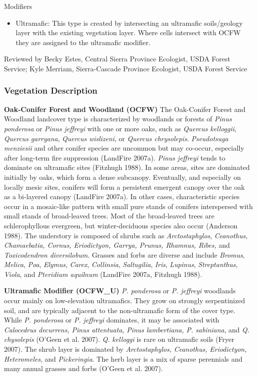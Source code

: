 Modifiers
\begin{itemize}
	\item Ultramafic: This type is created by intersecting an ultramafic soils/geology layer with the existing vegetation layer. Where cells intersect with OCFW they are assigned to the ultramafic modifier.
\end{itemize}

\noindent Reviewed by Becky Estes, Central Sierra Province Ecologist, USDA Forest Service; Kyle Merriam, Sierra-Cascade Province Ecologist, USDA Forest Service


\subsubsection{Vegetation Description}
\textbf{Oak-Conifer Forest and Woodland (OCFW)} The Oak-Conifer Forest and Woodland landcover type is characterized by woodlands or forests of \emph{Pinus ponderosa} or \emph{Pinus jeffreyi} with one or more oaks, such as \emph{Quercus kelloggii}, \emph{Quercus garryana}, \emph{Quercus wislizeni}, or \emph{Quercus chrysolepis}. \emph{Pseudotsuga menziesii} and other conifer species are uncommon but may co-occur, especially after long-term fire suppression (LandFire 2007a). \emph{Pinus jeffreyi} tends to dominate on ultramafic sites (Fitzhugh 1988). In some areas, sites are dominated initially by oaks, which form a dense subcanopy. Eventually, and especially on locally mesic sites, conifers will form a persistent emergent canopy over the oak as a bi-layered canopy (LandFire 2007a). In other cases, characteristic species occur in a mosaic-like pattern with small pure stands of conifers interspersed with small stands of broad-leaved trees. Most of the broad-leaved trees are schlerophyllous evergreen, but winter-deciduous species also occur (Anderson 1988). The understory is composed of shrubs such as \emph{Arctostaphylos}, \emph{Ceanothus, Chamaebatia, Cornus, Eriodictyon, Garrya, Prunus, Rhamnus, Ribes,} and \emph{Toxicodendron diversilobum}. Grasses and forbs are diverse and include \emph{Bromus}, \emph{Melica}, \emph{Poa}, \emph{Elymus}, \emph{Carex}, \emph{Collinsia}, \emph{Saltugilia}, \emph{Iris}, \emph{Lupinus}, \emph{Streptanthus}, \emph{Viola}, and \emph{Pteridium aquilnum} (LandFire 2007a, Fitzhugh 1988).

\begin{adjustwidth}{2cm}{}

\textbf{Ultramafic Modifier (OCFW\_U)}  \emph{P. ponderosa} or \emph{P. jeffreyi} woodlands occur mainly on low-elevation ultramafics. They grow on strongly serpentinized soil, and are typically adjacent to the non-ultramafic form of the cover type. While \emph{P. ponderosa} or \emph{P. jeffreyi} dominates, it may be associated with \emph{Calocedrus decurrens, Pinus attentuata, Pinus lambertiana, P. sabiniana}, and \emph{Q. chysolepis} (O'Geen et al. 2007). \emph{Q. kelloggi} is rare on ultramafic soils (Fryer 2007). The shrub layer is dominated by \emph{Arctostaphylos, Ceanothus, Eriodictyon, Heteromeles}, and \emph{Pickeringia}. The herb layer is a mix of sparse perennials and many annual grasses and forbs (O'Geen et al. 2007). 

\end{adjustwidth}


